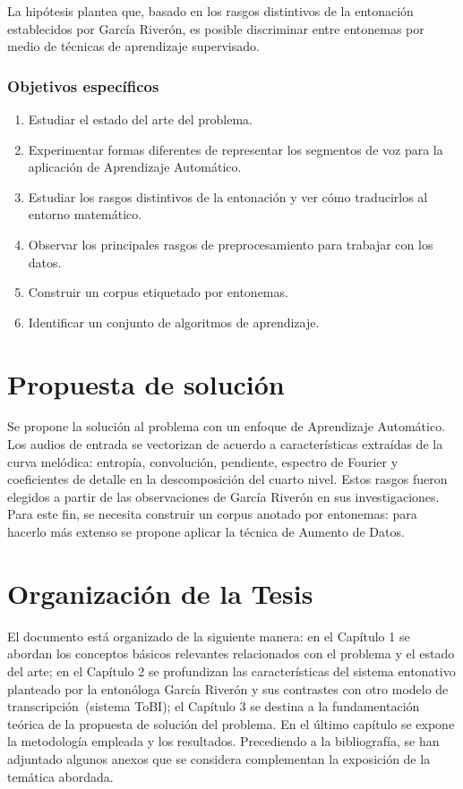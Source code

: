 La hip\'otesis plantea que, basado en los rasgos distintivos de la entonaci\'on establecidos por Garc\'ia River\'on, es posible discriminar entre entonemas por medio de t\'ecnicas de aprendizaje supervisado.

\subsubsection*{Objetivos espec\'ificos}

\begin{enumerate}
\item Estudiar el estado del arte del problema.
\item Experimentar formas diferentes de representar los segmentos de voz para la aplicaci\'on de Aprendizaje Autom\'atico.
\item Estudiar los rasgos distintivos de la entonaci\'on y ver c\'omo traducirlos al entorno matem\'atico.
\item Observar los principales rasgos de preprocesamiento para trabajar con los datos.
\item Construir un corpus etiquetado por entonemas.
\item Identificar un conjunto de algoritmos de aprendizaje.
\end{enumerate}


\section*{Propuesta de soluci\'on}
Se propone la soluci\'on al problema con un enfoque de Aprendizaje Autom\'atico. Los audios de entrada se vectorizan de acuerdo a caracter\'isticas extra\'idas de la curva mel\'odica: entrop\'ia, convoluci\'on, pendiente, espectro de Fourier y coeficientes de detalle en la descomposici\'on del cuarto nivel. Estos rasgos fueron elegidos a partir de las observaciones de Garc\'ia River\'on en sus investigaciones. Para este fin, se necesita construir un corpus anotado por entonemas: para hacerlo m\'as extenso se propone aplicar la t\'ecnica de Aumento de Datos.




\section*{Organizaci\'on de la Tesis}
El documento est\'a organizado de la siguiente manera: en el Cap\'itulo 1 se abordan los conceptos b\'asicos relevantes relacionados con el problema y el estado del arte; en el Cap\'itulo 2 se profundizan las caracter\'isticas del sistema entonativo planteado por la enton\'ologa Garc\'ia River\'on y sus contrastes con otro modelo de transcripci\'on~(sistema ToBI); el Cap\'itulo 3 se destina a la fundamentaci\'on te\'orica de la propuesta de soluci\'on del problema. En el \'ultimo cap\'itulo se expone la metodolog\'ia empleada y los resultados. Precediendo a la bibliograf\'ia, se han adjuntado algunos anexos que se considera complementan la exposici\'on de la tem\'atica abordada.